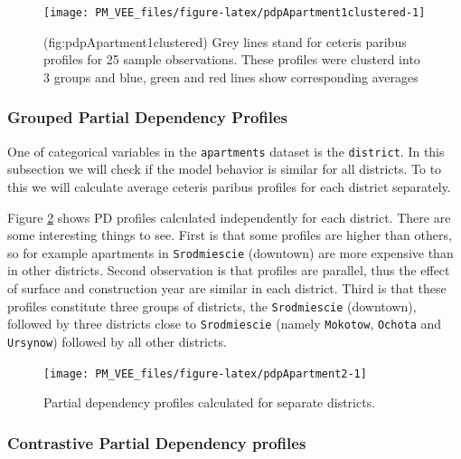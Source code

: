 \documentclass[12pt,]{krantz}
\begin{document}
\begin{figure}

{\centering \texttt{[image: PM\_VEE\_files/figure-latex/pdpApartment1clustered-1]} 

}

\caption{(fig:pdpApartment1clustered) Grey lines stand for ceteris paribus profiles for 25 sample observations. These profiles were clusterd into 3 groups and blue, green and red lines show corresponding averages}\label{fig:pdpApartment1clustered}
\end{figure}

\hypertarget{grouped-partial-dependency-profiles-1}{%
\subsubsection{Grouped Partial Dependency Profiles}\label{grouped-partial-dependency-profiles-1}}

One of categorical variables in the \texttt{apartments} dataset is the \texttt{district}. In this subsection we will check if the model behavior is similar for all districts. To to this we will calculate average ceteris paribus profiles for each district separately.

Figure \ref{fig:pdpApartment2} shows PD profiles calculated independently for each district. There are some interesting things to see. First is that some profiles are higher than others, so for example apartments in \texttt{Srodmiescie} (downtown) are more expensive than in other districts. Second observation is that profiles are parallel, thus the effect of surface and construction year are similar in each district. Third is that these profiles constitute three groups of districts, the \texttt{Srodmiescie} (downtown), followed by three districts close to \texttt{Srodmiescie} (namely \texttt{Mokotow}, \texttt{Ochota} and \texttt{Ursynow}) followed by all other districts.

\begin{figure}

{\centering \texttt{[image: PM\_VEE\_files/figure-latex/pdpApartment2-1]} 

}

\caption{Partial dependency profiles calculated for separate districts.}\label{fig:pdpApartment2}
\end{figure}

\hypertarget{contrastive-partial-dependency-profiles-1}{%
\subsubsection{Contrastive Partial Dependency profiles}\label{contrastive-partial-dependency-profiles-1}}
\end{document}
